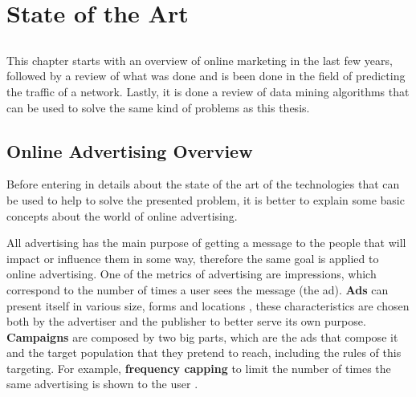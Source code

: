 \chapter{State of the Art} \label{chap:sota}

\section*{}

This chapter starts with an overview of online marketing in the last few years, followed by a review of
what was done and is been done in the field of predicting the traffic of a network.
Lastly, it is done a review of data mining algorithms that can be used to solve the same kind of problems as this thesis.

\section{Online Advertising Overview}

Before entering in details about the state of the art of the technologies that can be used to
help to solve the presented problem, it is better to explain some basic concepts about the world of online advertising.

All advertising has the main purpose of getting a message to the people that will impact or influence them in some way,
therefore the same goal is applied to online advertising.
One of the metrics of advertising are impressions, which correspond to the number of times a user sees the message (the ad).\cite{kOA}
\textbf{Ads} can present itself in various size\cite{kOA2}, forms and locations \cite{kOA3}, these characteristics are chosen both by the advertiser
and the publisher to better serve its own purpose.
\textbf{Campaigns} are composed by two big parts, which are the ads that compose it and the target population that they pretend to reach,
including the rules of this targeting. For example, \textbf{frequency capping} to limit the number of times the same advertising is shown to the user \cite{kOA}.

